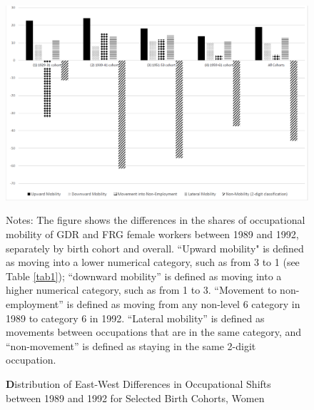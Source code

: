 \begin{Article}
\begin{refsection}[Spitz]
\begin{landscape}
    
\begin{figure}[!ht]
    \caption{\textbf Distribution of East-West Differences in Occupational Shifts between 1989 and 1992 for Selected Birth Cohorts, Women}\label{fig4}
    \begin{center}
    \includegraphics[width=.8\linewidth]{East_vs_West_Women.pdf}
    \vspace{-3.8cm}
    {\footnotesize
    \hspace*{0.1cm}\parbox[h]{\linewidth}{Notes: The figure shows the differences in the shares of occupational mobility of GDR and FRG female workers between 1989 and 1992, separately by birth cohort and overall. ``Upward mobility" is defined as moving into a lower numerical category, such as from 3 to 1 (see Table \ref{tab1}); ``downward mobility'' is defined as moving into a higher numerical category, such as from 1 to 3. ``Movement to non-employment'' is defined as moving from any non-level 6 category in 1989 to category 6 in 1992. ``Lateral mobility'' is defined as movements between occupations that are in the same category, and ``non-movement'' is defined as staying in the same 2-digit occupation.}}
    \end{center}
\end{figure}
\end{landscape}


\end{refsection}
\end{Article}
